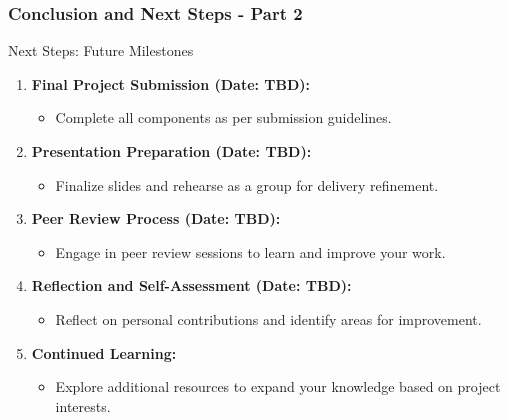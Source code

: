 \documentclass[aspectratio=169]{beamer}
\begin{document}
\begin{frame}[fragile]
  \frametitle{Conclusion and Next Steps - Part 2}

  \begin{block}{Next Steps: Future Milestones}
    \begin{enumerate}
      \item \textbf{Final Project Submission (Date: TBD):}
      \begin{itemize}
        \item Complete all components as per submission guidelines.
      \end{itemize}
      
      \item \textbf{Presentation Preparation (Date: TBD):}
      \begin{itemize}
        \item Finalize slides and rehearse as a group for delivery refinement.
      \end{itemize}
      
      \item \textbf{Peer Review Process (Date: TBD):}
      \begin{itemize}
        \item Engage in peer review sessions to learn and improve your work.
      \end{itemize}
      
      \item \textbf{Reflection and Self-Assessment (Date: TBD):}
      \begin{itemize}
        \item Reflect on personal contributions and identify areas for improvement.
      \end{itemize}
      
      \item \textbf{Continued Learning:}
      \begin{itemize}
        \item Explore additional resources to expand your knowledge based on project interests.
      \end{itemize}
    \end{enumerate}
  \end{block}
\end{frame}
\end{document}
